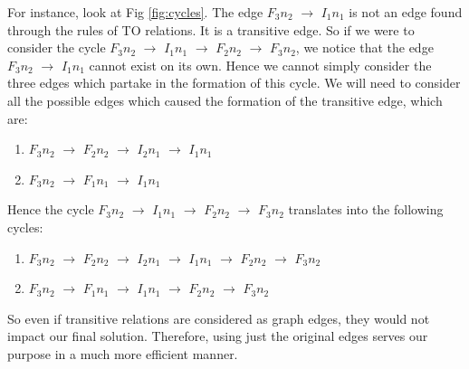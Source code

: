 For instance, look at Fig \ref{fig:cycles}. The edge \textit{$F_3n_2$} 
$\rightarrow$ \textit{$I_1n_1$} is not an edge found through the rules of 
TO relations. It is a transitive edge. So if we were to consider the cycle 
\textit{$F_3n_2$} $\rightarrow$ \textit{$I_1n_1$} $\rightarrow$ \textit{$F_2n_2$}
$\rightarrow$ \textit{$F_3n_2$}, we notice that the edge \textit{$F_3n_2$} 
$\rightarrow$ \textit{$I_1n_1$} cannot exist on its own. Hence we cannot simply 
consider the three edges which partake in the formation of this cycle.
We will need to consider all the possible edges which caused the formation of the 
transitive edge, which are:
\begin{enumerate}
	\item \textit{$F_3n_2$} $\rightarrow$ \textit{$F_2n_2$} $\rightarrow$ 
\textit{$I_2n_1$} $\rightarrow$ \textit{$I_1n_1$}
	\item \textit{$F_3n_2$} $\rightarrow$ \textit{$F_1n_1$} $\rightarrow$ \textit{$I_1n_1$}
\end{enumerate}

Hence the cycle \textit{$F_3n_2$} $\rightarrow$ \textit{$I_1n_1$} $\rightarrow$
\textit{$F_2n_2$} $\rightarrow$ \textit{$F_3n_2$} translates into the following cycles:
\begin{enumerate}
	\item \textit{$F_3n_2$} $\rightarrow$ \textit{$F_2n_2$} $\rightarrow$ \textit{$I_2n_1$} 
$\rightarrow$ \textit{$I_1n_1$} $\rightarrow$ \textit{$F_2n_2$} $\rightarrow$ \textit{$F_3n_2$}
	\item \textit{$F_3n_2$} $\rightarrow$ \textit{$F_1n_1$} $\rightarrow$ \textit{$I_1n_1$} $\rightarrow$
\textit{$F_2n_2$} $\rightarrow$ \textit{$F_3n_2$}
\end{enumerate}


\par
So even if transitive \setTO relations are considered as graph edges, 
they would not impact our final solution. 
Therefore, using just the original edges serves our purpose 
in a much more efficient manner.